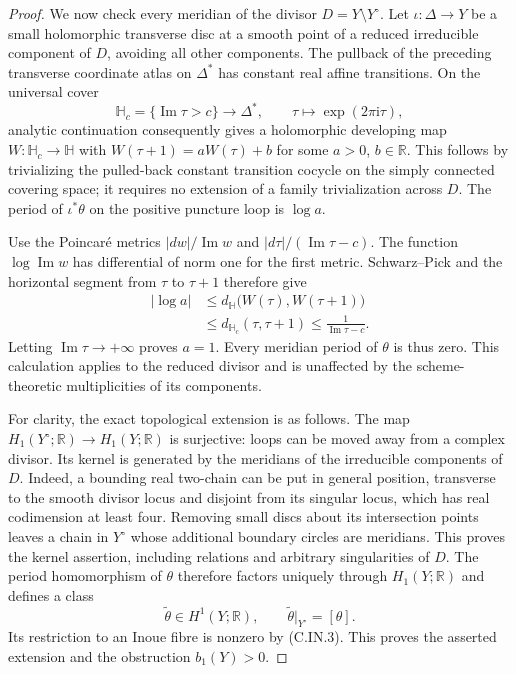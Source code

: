 \begin{proof}
We now check every meridian of the divisor
$D=Y\setminus Y^\circ$. Let $\iota:\Delta\to Y$ be a small
holomorphic transverse disc at a smooth point of a reduced
irreducible component of $D$, avoiding all other components.
The pullback of the preceding transverse coordinate atlas on
$\Delta^*$ has constant real affine transitions. On the universal
cover
\[
 \mathbb H_c=\{\operatorname{Im}\tau>c\}
 \longrightarrow\Delta^*,\qquad
 \tau\longmapsto\exp(2\pi\mathrm i\tau),
\]
analytic continuation consequently gives a holomorphic developing
map $W:\mathbb H_c\to\mathbb H$ with
$W(\tau+1)=aW(\tau)+b$ for some $a>0$, $b\in\mathbb R$.
This follows by trivializing the pulled-back constant transition
cocycle on the simply connected covering space; it requires no
extension of a family trivialization across $D$.
The period of $\iota^*\theta$ on the positive puncture loop is
$\log a$.

Use the Poincar\'e metrics
$|dw|/\operatorname{Im}w$ and
$|d\tau|/(\operatorname{Im}\tau-c)$.
The function $\log\operatorname{Im}w$ has differential of norm
one for the first metric. Schwarz--Pick and the horizontal segment
from $\tau$ to $\tau+1$ therefore give
\[
\begin{aligned}
 |\log a|
 &\le d_{\mathbb H}\bigl(W(\tau),W(\tau+1)\bigr)\\
 &\le d_{\mathbb H_c}(\tau,\tau+1)
 \le\frac{1}{\operatorname{Im}\tau-c}.
\end{aligned}
\tag{C.IN.5}
\]
Letting $\operatorname{Im}\tau\to+\infty$ proves $a=1$.
Every meridian period of $\theta$ is thus zero. This calculation
applies to the reduced divisor and is unaffected by the
scheme-theoretic multiplicities of its components.

For clarity, the exact topological extension is as follows.
The map $H_1(Y^\circ;\mathbb R)\to H_1(Y;\mathbb R)$ is
surjective: loops can be moved away from a complex divisor.
Its kernel is generated by the meridians of the irreducible
components of $D$. Indeed, a bounding real two-chain can be put
in general position, transverse to the smooth divisor locus and
disjoint from its singular locus, which has real codimension at
least four. Removing small discs about its intersection points
leaves a chain in $Y^\circ$ whose additional boundary circles
are meridians. This proves the kernel assertion, including
relations and arbitrary singularities of $D$.
The period homomorphism of $\theta$ therefore factors uniquely
through $H_1(Y;\mathbb R)$ and defines a class
\[
 \widetilde\theta\in H^1(Y;\mathbb R),\qquad
 \widetilde\theta|_{Y^\circ}=[\theta].
\tag{C.IN.6}
\]
Its restriction to an Inoue fibre is nonzero by (C.IN.3).
This proves the asserted extension and the obstruction $b_1(Y)>0$.


\end{proof}
